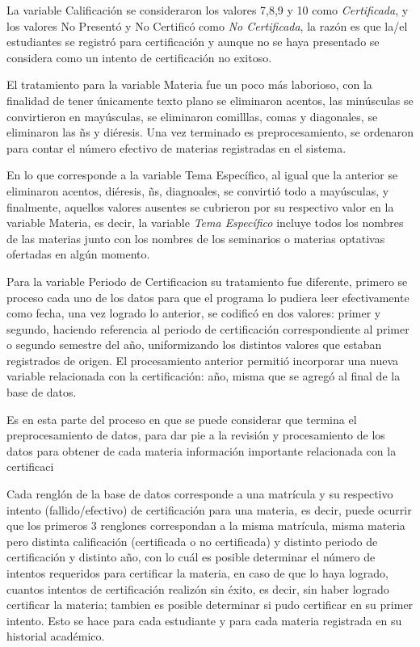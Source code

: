 \documentclass[12pt]{article}
\begin{document}
La variable Calificaci\'on se consideraron los valores 7,8,9 y 10 como \textit{Certificada}, y los valores No Present\'o y No Certific\'o como \textit{No Certificada}, la raz\'on es que la/el estudiantes se registr\'o para certificaci\'on y aunque no se haya presentado se considera como un intento de certificaci\'on no exitoso.

                  
El tratamiento para la variable Materia fue un poco m\'as laborioso, con la finalidad de tener \'unicamente texto plano se eliminaron acentos, las min\'usculas se convirtieron en may\'usculas, se eliminaron comilllas, comas y diagonales, se eliminaron las \~ns y di\'eresis. Una vez terminado es preprocesamiento, se ordenaron para contar el n\'umero efectivo de materias registradas en el sistema.

En lo que corresponde a la variable Tema Espec\'ifico, al igual que la anterior se eliminaron acentos, di\'eresis, \~ns, diagnoales, se convirti\'o todo a may\'usculas, y finalmente, aquellos valores ausentes se cubrieron por su respectivo valor en la variable Materia, es decir, la variable \textit{Tema Espec\'ifico} incluye todos los nombres de las materias junto con los nombres de los seminarios o materias optativas ofertadas en alg\'un momento.

Para la variable Periodo de Certificacion su tratamiento fue diferente, primero se proceso cada uno de los datos para que el programa lo pudiera leer efectivamente como fecha, una vez logrado lo anterior, se codific\'o en dos valores: primer y segundo, haciendo referencia al periodo de certificaci\'on correspondiente al primer o segundo semestre del a\~no, uniformizando los distintos valores que estaban registrados de origen. El procesamiento anterior permiti\'o incorporar una nueva variable relacionada con la certificaci\'on: a\~no, misma que se agreg\'o al final de la base de datos.

Es en esta parte del proceso en que se puede considerar que termina el preprocesamiento de datos, para dar pie a la revisión y procesamiento de los datos para obtener de cada materia informaci\'on importante relacionada con la certificaci\

Cada rengl\'on de la base de datos corresponde a una matr\'icula y su respectivo intento (fallido/efectivo) de certificaci\'on para una materia, es decir, puede ocurrir que los primeros 3 renglones correspondan a la misma matr\'icula, misma materia pero distinta calificaci\'on (certificada o no certificada) y distinto periodo de certificaci\'on y distinto a\~no, con lo cu\'al es posible determinar el n\'umero de intentos requeridos para certificar la materia, en caso de que lo haya logrado, cuantos intentos de certificaci\'on realiz\'on sin \'exito, es decir, sin haber logrado certificar la materia; tambien es posible determinar si pudo certificar en su primer intento. Esto se hace para cada estudiante y para cada materia registrada en su historial acad\'emico. 
\end{document}

